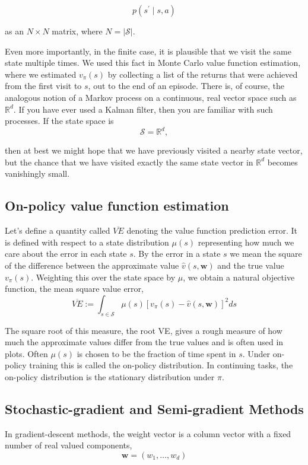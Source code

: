 \documentclass[11pt]{article}
\theoremstyle{plain} %
\theoremstyle{remark}
\begin{document}
$$
p\left(s^{\prime} \mid s, a\right)
$$

as an $N \times N$ matrix, where $N=|\mathcal{S}|$.

Even more importantly, in the finite case, it is plausible that we visit
  the same state multiple times. We used this fact in Monte Carlo value function estimation, where we
  estimated $v_{\pi}(s)$ by collecting a list of the returns that were achieved
  from the first visit to $s$, out to the end of an episode. There is, of course, the analogous notion of a Markov process on a
  continuous, real vector space such as $\mathbb{R}^{d}$. If you have ever used a Kalman filter, then you are familiar with such
  processes. If the state space is
$$
\mathcal{S}=\mathbb{R}^{d},
$$

then at best we might hope that we have previously visited a nearby state
vector, but the chance that we have visited exactly the same state vector in
$\mathbb{R}^{d}$ becomes vanishingly small.

\subsection{On-policy value function estimation}
 Let's define a quantity called $\overline{V E}$ denoting the value
  function prediction error. It is defined with respect to a state distribution $\mu(s)$ representing
  how much we care about the error in each state $s$. By the error in a state $s$ we mean the square of the difference between
  the approximate value $\hat{v}(s, \boldsymbol{w})$ and the true value $v_{\pi}(s)$. Weighting this over the state space by $\mu$, we obtain a natural
  objective function, the mean square value error, 
$$
\overline{V E}:=\int_{s \in \mathcal{S}} \mu(s)\left[v_{\pi}(s)-\hat{v}(s, \boldsymbol{w})\right]^{2} d s
$$

 The square root of this measure, the root VE, gives a rough measure of how much
  the approximate values differ from the true values and is often used in plots.
  Often $\mu(s)$ is chosen to be the fraction of time spent in $s$. Under
  {\color{C3}on-policy training} this is called the {\color{C3}on-policy
  distribution}. In continuing tasks, the on-policy distribution is the
  stationary distribution under $\pi$.

\subsection{Stochastic-gradient and Semi-gradient Methods}
In gradient-descent methods, the weight vector is a column vector with a
  fixed number of real valued components, 
$$
\boldsymbol{w}=\left(w_{1}, \ldots, w_{d}\right)
$$
\end{document}

